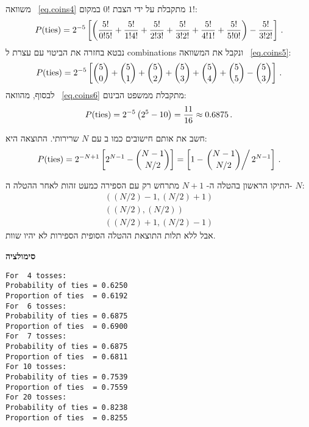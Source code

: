 משוואה%
~\ref{eq.coins4}
מתקבלת על ידי הצבת
$0!$
במקום
$1!$:
\begin{equation}\label{eq.coins4}
P(\textrm{ties})=2^{-5}\left[
\left(\displaystyle\frac{5!}{0!5!} + \displaystyle\frac{5!}{1!4!} +
\displaystyle\frac{5!}{2!3!} + \displaystyle\frac{5!}{3!2!} +\displaystyle\frac{5!}{4!1!} +
\displaystyle\frac{5!}{5!0!}\right) - \displaystyle\frac{5!}{3!2!}
\right]\,.
\end{equation}
נבטא בחזרה את הביטוי עם עצרת ל
combinations
ונקבל את המשוואה%
~\ref{eq.coins5}:
\begin{equation}\label{eq.coins5}
P(\textrm{ties})=2^{-5}\left[
\displaystyle{5 \choose 0} + \displaystyle{5 \choose 1} +
\displaystyle{5 \choose 2} + \displaystyle{5 \choose 3} +
\displaystyle{5 \choose 4} + \displaystyle{5 \choose 5} - \displaystyle{5 \choose 3}
\right]\,.
\end{equation}
לבסוף, מהוואה%
~\ref{eq.coins6}
מתקבלת ממשפט הבינום:
\begin{equation}\label{eq.coins6}
P(\textrm{ties})=2^{-5}\left(2^5 - 10\right)=\displaystyle\frac{11}{16}\approx 0.6875\,.
\end{equation}

חשב את אותם חישובים כמו ב%
עם 
$N$
שרירותי. התוצאה היא:
\[
P(\textrm{ties})=2^{-N+1}\left[2^{N-1} - \displaystyle{N-1 \choose N/2}\right]= 
\left[1 - \left.\displaystyle{N-1 \choose N/2}\right/ 2^{N-1}\right]\,.
\]

התיקו הראשון בהטלה ה-%
$N+1$
מתרחש רק עם הספירה כמעט זהות לאחר ההטלה ה-%
$N$:
\[
\begin{array}{l}
((N/2)-1,(N/2)+1)\\((N/2),(N/2))\\((N/2)+1,(N/2)-1)
\end{array}
\]
אבל ללא תלות התוצאת ההטלה הסופית הספירות לא יהיו שוות.

\textbf{סימולציה}
\begin{verbatim}
For  4 tosses:
Probability of ties = 0.6250
Proportion of ties  = 0.6192
For  6 tosses:
Probability of ties = 0.6875
Proportion of ties  = 0.6900
For  7 tosses:
Probability of ties = 0.6875
Proportion of ties  = 0.6811
For 10 tosses:
Probability of ties = 0.7539
Proportion of ties  = 0.7559
For 20 tosses:
Probability of ties = 0.8238
Proportion of ties  = 0.8255
\end{verbatim}






